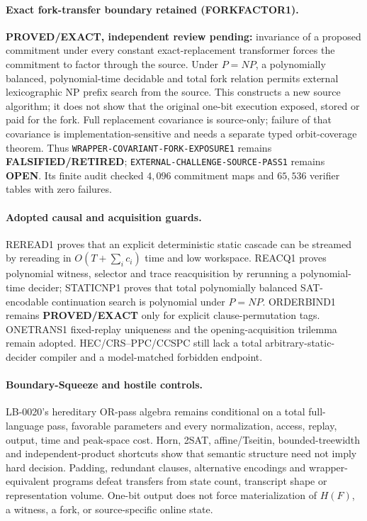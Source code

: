\documentclass[11pt]{article}
\begin{document}
\paragraph{Exact fork-transfer boundary retained (FORKFACTOR1).}
\textbf{PROVED/EXACT, independent review pending:} invariance of a proposed
commitment under every constant exact-replacement transformer forces the
commitment to factor through the source.  Under \(P=NP\), a polynomially
balanced, polynomial-time decidable and total fork relation permits external
lexicographic NP prefix search from the source.  This constructs a new source
algorithm; it does not show that the original one-bit execution exposed,
stored or paid for the fork.  Full replacement covariance is source-only;
failure of that covariance is implementation-sensitive and needs a separate
typed orbit-coverage theorem.  Thus
\texttt{WRAPPER-COVARIANT-FORK-EXPOSURE1} remains
\textbf{FALSIFIED/RETIRED}; \texttt{EXTERNAL-CHALLENGE-SOURCE-PASS1} remains
\textbf{OPEN}.  Its finite audit checked \(4{,}096\) commitment maps and
\(65{,}536\) verifier tables with zero failures.

\paragraph{Adopted causal and acquisition guards.}
REREAD1 proves that an explicit deterministic static cascade can be streamed
by rereading in \(O(T+\sum_i c_i)\) time and low workspace.  REACQ1 proves
polynomial witness, selector and trace reacquisition by rerunning a
polynomial-time decider; STATICNP1 proves that total polynomially balanced
SAT-encodable continuation search is polynomial under \(P=NP\).
ORDERBIND1 remains \textbf{PROVED/EXACT} only for explicit
clause-permutation tags.  ONETRANS1 fixed-replay uniqueness and the
opening-acquisition trilemma remain adopted.  HEC/CRS--PPC/CCSPC still lack a
total arbitrary-static-decider compiler and a model-matched forbidden
endpoint.

\paragraph{Boundary-Squeeze and hostile controls.}
LB-0020's hereditary OR-pass algebra remains conditional on a total
full-language pass, favorable parameters and every normalization, access,
replay, output, time and peak-space cost.  Horn, 2SAT, affine/Tseitin,
bounded-treewidth and independent-product shortcuts show that semantic
structure need not imply hard decision.  Padding, redundant clauses,
alternative encodings and wrapper-equivalent programs defeat transfers from
state count, transcript shape or representation volume.  One-bit output does
not force materialization of \(H(F)\), a witness, a fork, or source-specific
online state.
\end{document}
